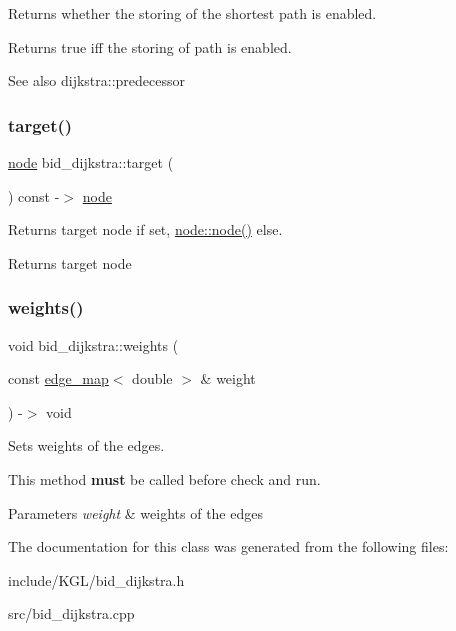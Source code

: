 Returns whether the storing of the shortest path is enabled. 

\begin{DoxyReturn}{Returns}
{\ttfamily true} iff the storing of path is enabled.
\end{DoxyReturn}
\begin{DoxySeeAlso}{See also}
dijkstra\+::predecessor 
\end{DoxySeeAlso}
\mbox{\label{classbid__dijkstra_a3eea86ca2a83dec8aee865f2f4f00f26}} 
\subsubsection{\texorpdfstring{target()}{target()}}
{\footnotesize\ttfamily \mbox{\hyperlink{classnode}{node}} bid\+\_\+dijkstra\+::target (\begin{DoxyParamCaption}{ }\end{DoxyParamCaption}) const -\/$>$ \mbox{\hyperlink{classnode}{node}}}



Returns target node if set, {\ttfamily \mbox{\hyperlink{classnode_ad603259398d5667e3b97a6322a2bcc20}{node\+::node()}}} else. 

\begin{DoxyReturn}{Returns}
target node 
\end{DoxyReturn}
\mbox{\label{classbid__dijkstra_a7f077bb3c17567414bec7d733bb7daec}} 
\subsubsection{\texorpdfstring{weights()}{weights()}}
{\footnotesize\ttfamily void bid\+\_\+dijkstra\+::weights (\begin{DoxyParamCaption}\item[{const \mbox{\hyperlink{classedge__map}{edge\+\_\+map}}$<$ double $>$ \&}]{weight }\end{DoxyParamCaption}) -\/$>$ void}



Sets weights of the edges. 

This method {\bfseries must} be called before check and run.


\begin{DoxyParams}{Parameters}
{\em weight} & weights of the edges \\
\hline
\end{DoxyParams}


The documentation for this class was generated from the following files\+:\begin{DoxyCompactItemize}
\item 
include/\+K\+G\+L/bid\+\_\+dijkstra.\+h\item 
src/bid\+\_\+dijkstra.\+cpp\end{DoxyCompactItemize}
